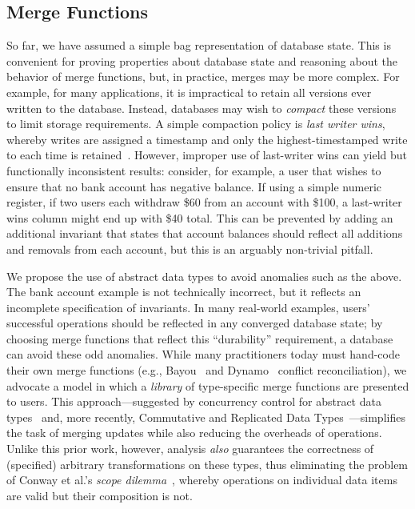 \subsection{Merge Functions}
\label{sec:merge}

So far, we have assumed a simple bag representation of database
state. This is convenient for proving properties about database state
and reasoning about the behavior of merge functions, but, in practice,
merges may be more complex. For example, for many applications, it is
impractical to retain all versions ever written to the
database. Instead, databases may wish to \textit{compact} these
versions to limit storage requirements. A simple compaction policy is
\textit{last writer wins}, whereby writes are assigned a timestamp and
only the highest-timestamped write to each time is
retained~\cite{dynamo}. However, improper use of last-writer wins can
yield \iconfluent but functionally inconsistent results: consider, for
example, a user that wishes to ensure that no bank account has
negative balance. If using a simple numeric register, if two users
each withdraw \$60 from an account with \$100, a last-writer wins
column might end up with \$40 total. This can be prevented by adding
an additional invariant that states that account balances should
reflect all additions and removals from each account, but this is an
arguably non-trivial pitfall.

We propose the use of abstract data types to avoid anomalies such as
the above. The bank account example is not technically incorrect, but
it reflects an incomplete specification of invariants. In many
real-world examples, users' successful operations should be reflected
in any converged database state; by choosing merge functions that
reflect this ``durability'' requirement, a database can avoid these
odd anomalies. While many practitioners today must hand-code their own
merge functions (e.g., Bayou~\cite{bayou} and Dynamo~\cite{dynamo}
conflict reconciliation), we advocate a model in which a
\textit{library} of type-specific merge functions are presented to
users. This approach---suggested by concurrency control for abstract
data types~\cite{weihl-thesis} and, more recently, Commutative and
Replicated Data Types~\cite{crdt}---simplifies the task of merging
updates while also reducing the overheads of operations. Unlike this
prior work, however, \iconfluence analysis \textit{also} guarantees
the correctness of (specified) arbitrary transformations on these
types, thus eliminating the problem of Conway et al.'s
\textit{scope dilemma}~\cite{blooml}, whereby operations on individual
data items are valid but their composition is not.




